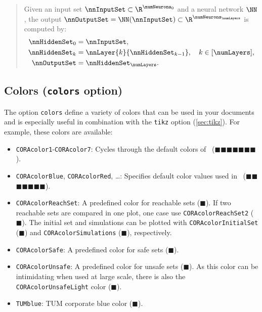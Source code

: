 \documentclass{article}
\newcommand{\showColor}[1]{{\color{#1}$\blacksquare$}}
\begin{document}
\begin{quote}
  Given an input set $\nnInputSet\subset\R^{\numNeurons_0}$ and a neural network $\NN$,
  the output $\nnOutputSet=\NN(\nnInputSet)\subset\R^{\numNeurons_\numLayers}$ is computed by:
  \begin{align}
    \begin{split}
      \nnHiddenSet_0 &= \nnInputSet, \\
      \nnHiddenSet_k &= \nnLayer{k}{\nnHiddenSet_{k-1}}, \quad k\in[\numLayers], \\
      \nnOutputSet &= \nnHiddenSet_\numLayers.
    \end{split}
  \end{align}
\end{quote}

\subsection{Colors (\texttt{colors} option)} \label{sec:colors}
The option \texttt{colors} define a variety of colors that can be used in your documents
and is especially useful in combination with the \texttt{tikz} option (\cref{sec:tikz}).
For example, these colors are available:

\begin{itemize}
  \item \texttt{CORAcolor1}-\texttt{CORAcolor7}: Cycles through the default colors of \CORA\ 
        (\showColor{CORAcolor1}\showColor{CORAcolor2}\showColor{CORAcolor3}\showColor{CORAcolor4}\showColor{CORAcolor5}\showColor{CORAcolor6}\showColor{CORAcolor7}).
  \item \texttt{CORAcolorBlue}, \texttt{CORAcolorRed}, \ldots: Specifies default color values used in \CORA\ 
        (\showColor{CORAcolorBlue}\showColor{CORAcolorRed}\showColor{CORAcolorYellow}\showColor{CORAcolorPurple}\showColor{CORAcolorGreen}\showColor{CORAcolorLightBlue}\showColor{CORAcolorDarkRed}).
  \item \texttt{CORAcolorReachSet}: A predefined color for reachable sets (\showColor{CORAcolorReachSet}).
        If two reachable sets are compared in one plot, one case use \texttt{CORAcolorReachSet2} (\showColor{CORAcolorReachSet2}).
        The initial set and simulations can be plotted with \texttt{CORAcolorInitialSet} (\showColor{CORAcolorInitialSet}) and \texttt{CORAcolorSimulations} (\showColor{CORAcolorSimulations}), respectively.
  \item \texttt{CORAcolorSafe}: A predefined color for safe sets (\showColor{CORAcolorSafe}).
  \item \texttt{CORAcolorUnsafe}: A predefined color for unsafe sets (\showColor{CORAcolorUnsafe}).
        As this color can be intimidating when used at large scale, there is also the \texttt{CORAcolorUnsafeLight} color (\showColor{CORAcolorUnsafeLight}).

  \item \texttt{TUMblue}: TUM corporate blue color (\showColor{TUMblue}).
\end{itemize}
\end{document}
